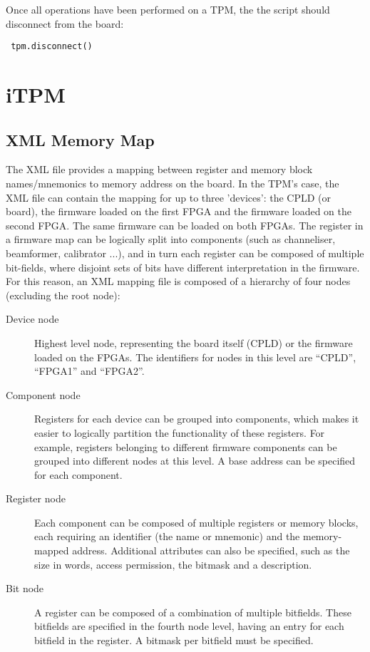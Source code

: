 \documentclass[a4paper,11pt]{article}
\begin{document}
Once all operations have been performed on a TPM, the the script should 
disconnect from the board:

\begin{lstlisting}
 tpm.disconnect()
\end{lstlisting}


\section{iTPM}

\subsection{XML Memory Map}
\label{XML}

The XML file provides a mapping between register and memory block 
names/mnemonics to memory address on the board. In the TPM's case, the XML file 
can contain the mapping for up to three 'devices': the CPLD (or board), the 
firmware loaded on the first FPGA and the firmware loaded on the second FPGA. 
The same firmware can be loaded on both FPGAs. The register in a firmware map 
can be logically split into components (such as channeliser, beamformer, 
calibrator ...), and in turn each register can be composed of multiple 
bit-fields, where disjoint sets of bits have different interpretation in the 
firmware. For this reason, an XML mapping file is composed of a hierarchy of 
four nodes (excluding the root node):
\begin{description}
 \item[Device node] Highest level node, representing the board itself (CPLD) or 
the firmware loaded on the FPGAs. The identifiers for nodes in this level are 
``CPLD'', ``FPGA1'' and ``FPGA2''.
 \item[Component node] Registers for each device can be grouped into 
components, which makes it easier to logically partition the functionality of 
these registers. For example, registers belonging to different firmware 
components can be grouped into different nodes at this level. A base address 
can 
be specified for each component.
 \item[Register node] Each component can be composed of multiple registers or 
memory blocks, each requiring an identifier (the name or mnemonic) and the 
memory-mapped address. Additional attributes can also be specified, such as the 
size in words, access permission, the bitmask and a description. 
 \item[Bit node] A register can be composed of a combination of multiple 
bitfields. These bitfields are specified in the fourth node level, having an 
entry for each bitfield in the register. A bitmask per bitfield must be 
specified.
\end{description}
\end{document}

